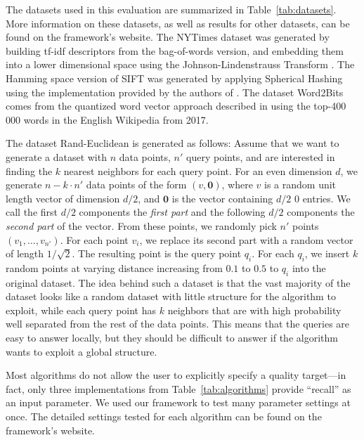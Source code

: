 \medskip

 The datasets used in this evaluation are summarized in Table~\ref{tab:datasets}. More information on these datasets, as well as results for other datasets, can be found on the framework's website. The \textsf{NYTimes} dataset was generated by building tf-idf descriptors from the bag-of-words version, and embedding them into a lower dimensional space using the Johnson-Lindenstrauss Transform \cite{JohnsonL86}. The Hamming space version of \textsf{SIFT}
was generated by applying Spherical Hashing \cite{HeoLHCY15}  using the implementation provided by the authors of \cite{HeoLHCY15}. The dataset \textsf{Word2Bits} comes from 
the quantized word vector approach described in \cite{Lam18} using the top-400\,000 words in the English Wikipedia from 2017.

The dataset \textsf{Rand-Euclidean} is generated as follows: Assume that we want to generate a dataset with $n$ data points, $n'$ query points, and are interested in finding the $k$ nearest neighbors for each query point. For an even dimension $d$, we generate $n - k\cdot n'$ data points of the form $(v, \mathbf{0})$, where $v$ is a random unit length vector of dimension $d/2$, and $\mathbf{0}$ is the vector containing $d/2$ $0$ entries. We call the first $d/2$ components the \emph{first part} and the following $d/2$ components the \emph{second part} of the vector.
From these points, we randomly pick $n'$ points $(v_1,\ldots,v_{n'})$. For each point $v_i$, we replace its second part with a random vector of length $1/\sqrt{2}$. The resulting point is the query point $q_i$. For each $q_i$, we insert $k$ random points at varying distance increasing from $0.1$ to $0.5$ to $q_i$ into the original dataset. The idea behind such a dataset is that the vast majority of the dataset looks like a random dataset with little structure for the algorithm to exploit, while
each query point has $k$ neighbors that are with high probability well separated from the rest of the data points. This means that the queries are easy to answer locally, but they should be difficult to answer if the algorithm wants to exploit a global structure.
 
\medskip
 
 Most algorithms do not allow the user to explicitly specify a quality target---in fact, only 
three implementations from Table~\ref{tab:algorithms} provide ``recall'' as an input parameter. We used our framework to test many parameter settings at once. The detailed settings tested for each algorithm can be found on the framework's website. 

